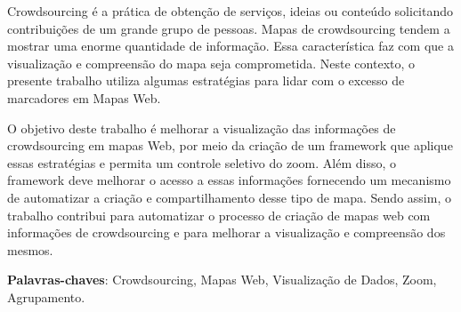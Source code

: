 \documentclass[12pt,oneside,openany,a4paper]{abntex2}	%
\begin{document}






\begin{resumo}
Crowdsourcing é  a prática de obtenção de serviços, ideias ou conteúdo solicitando contribuições de um grande grupo de pessoas. Mapas de crowdsourcing tendem a mostrar uma enorme quantidade de informação. Essa característica faz com que a visualização e  compreensão do mapa seja comprometida.
Neste contexto, o presente trabalho utiliza algumas estratégias para lidar com o excesso de marcadores em Mapas Web. 

O objetivo deste trabalho é melhorar a visualização das informações de crowdsourcing em mapas Web, por meio da criação de um framework que aplique essas estratégias e permita um controle seletivo do zoom.  Além disso, o framework deve melhorar o acesso a essas informações fornecendo um mecanismo de automatizar a criação e compartilhamento desse tipo de mapa.
Sendo assim, o trabalho contribui para automatizar o processo de criação de mapas web com informações de crowdsourcing e para melhorar a visualização e compreensão dos mesmos.


 \vspace{\onelineskip}
    
 \noindent
\textbf{Palavras-chaves}: Crowdsourcing, Mapas Web,  Visualização de Dados, Zoom, Agrupamento.
\end{resumo}
\end{document}
